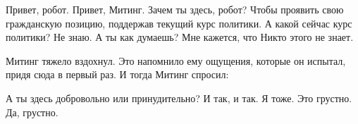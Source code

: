 \begin{dialog}
\X Привет, робот.
\R Привет, Митинг.
\X Зачем ты здесь, робот?
\R Чтобы проявить свою гражданскую позицию, поддержав текущий курс политики.
\X А какой сейчас курс политики?
\R Не знаю. А ты как думаешь?
\X Мне кажется, что Никто этого не знает.
\end{dialog}

\begin{monolog}
Митинг тяжело вздохнул. Это напомнило ему ощущения, которые он испытал, придя сюда в первый раз. И тогда Митинг спросил:
\end{monolog}

\begin{dialog}
\X А ты здесь добровольно или принудительно?
\R И так, и так.
\X Я тоже.
\R Это грустно.
\X Да, грустно.
\end{dialog}